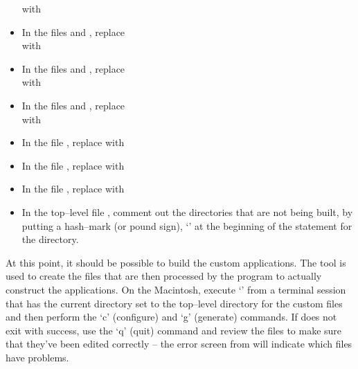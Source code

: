 \begin{itemize}
with 
\item In the files  and ,
replace\\
with 
\item In the files  and ,
replace\\
with 
\item In the files  and ,
replace\\
with 
\item In the file , replace
 with\\
\item In the file , replace
 with\\
\item In the file , replace
 with\\
\item In the top--level file , comment out the directories that are
not being built, by putting a hash--mark (or pound sign), `\asCode{\#}' at the beginning
of the  statement for the directory.
\end{itemize}
\tertiaryEnd{}
At this point, it should be possible to build the custom applications.
The tool  is used to create the files that are then processed by the
 program to actually construct the applications.
On the Macintosh, execute `' from a terminal session that has the current
directory set to the top--level directory for the custom files and then perform the
`c' (configure) and `g' (generate) commands.
If  does not exit with success, use the `q' (quit) command and review the
 files to make sure that they've been edited correctly -- the error
screen from  will indicate which files have problems.\\


